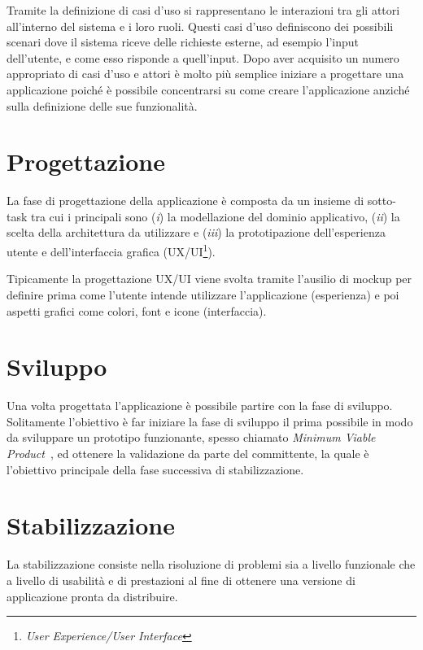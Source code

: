 Tramite la definizione di casi d'uso si rappresentano le interazioni tra gli attori all'interno del sistema e i loro ruoli. Questi casi d'uso definiscono dei possibili scenari dove il sistema riceve delle richieste esterne, ad esempio l'input dell'utente, e come esso risponde a quell'input. Dopo aver acquisito un numero appropriato di casi d'uso e attori è molto più semplice iniziare a progettare una applicazione poiché è possibile concentrarsi su come creare l'applicazione anziché sulla definizione delle sue funzionalità.

\section{Progettazione}
La fase di progettazione della applicazione è composta da un insieme di sotto-task tra cui i principali sono (\textit{i}) la modellazione del dominio applicativo, (\textit{ii}) la scelta della architettura da utilizzare e (\textit{iii}) la prototipazione dell'esperienza utente e dell'interfaccia grafica (UX/UI\footnote{\textit{User Experience/User Interface}}).

Tipicamente la progettazione UX/UI viene svolta tramite l'ausilio di mockup per definire prima come l'utente intende utilizzare l'applicazione (esperienza) e poi aspetti grafici come colori, font e icone (interfaccia).

\section{Sviluppo}
Una volta progettata l'applicazione è possibile partire con la fase di sviluppo. Solitamente l'obiettivo è far iniziare la fase di sviluppo il prima possibile in modo da sviluppare un prototipo funzionante, spesso chiamato \textit{Minimum Viable Product}~\cite{ries2011startup}, ed ottenere la validazione da parte del committente, la quale è l'obiettivo principale della fase successiva di stabilizzazione.

\section{Stabilizzazione}
La stabilizzazione consiste nella risoluzione di problemi sia a livello funzionale che a livello di usabilità e di prestazioni al fine di ottenere una versione di applicazione pronta da distribuire. 

